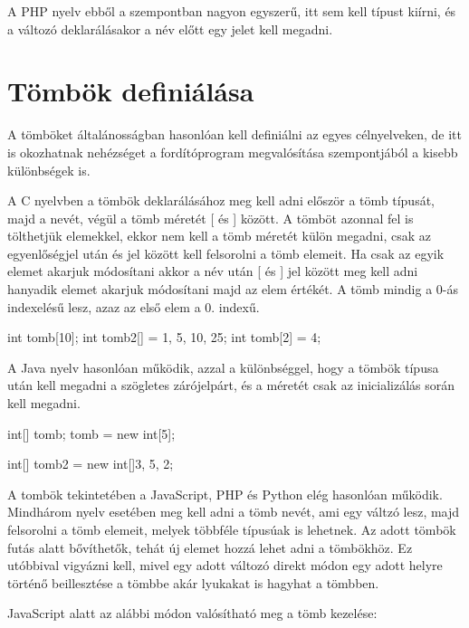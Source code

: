 A PHP nyelv ebből a szempontban nagyon egyszerű, itt sem kell típust kiírni, és a változó deklarálásakor a név előtt egy \textdollar jelet kell megadni.


\section{Tömbök definiálása}

A tömböket általánosságban hasonlóan kell definiálni az egyes célnyelveken, de itt is okozhatnak nehézséget a fordítóprogram megvalósítása szempontjából a kisebb különbségek is.

A C nyelvben a tömbök deklarálásához meg kell adni először a tömb típusát, majd a nevét, végül a tömb méretét [ és ] között. A tömböt azonnal fel is tölthetjük elemekkel, ekkor nem kell a tömb méretét külön megadni, csak az egyenlőségjel után { és } jel között kell felsorolni a tömb elemeit.
Ha csak az egyik elemet akarjuk módosítani akkor a név után [ és ] jel között meg kell adni hanyadik elemet akarjuk módosítani majd az elem értékét. A tömb mindig a 0-ás indexelésű lesz, azaz az első elem a 0. indexű.

\begin{cpp}
	int tomb[10];
	int tomb2[] = {1, 5, 10, 25};
	int tomb[2] = 4;
\end{cpp}

A Java nyelv hasonlóan működik, azzal a különbséggel, hogy a tömbök típusa után kell megadni a szögletes zárójelpárt, és a méretét csak az inicializálás során kell megadni.

\begin{cpp}
	int[] tomb;
	tomb = new int[5];
	
	int[] tomb2 = new int[]{3, 5, 2};
\end{cpp}

A tombök tekintetében a JavaScript, PHP és Python elég hasonlóan működik. Mindhárom nyelv esetében meg kell adni a tömb nevét, ami egy váltzó lesz, majd felsorolni a tömb elemeit, melyek többféle típusúak is lehetnek. Az adott tömbök futás alatt bővíthetők, tehát új elemet hozzá lehet adni a tömbökhöz. Ez utóbbival vigyázni kell, mivel egy adott változó direkt módon egy adott helyre történő beillesztése a tömbbe akár lyukakat is hagyhat a tömbben.

JavaScript alatt az alábbi módon valósítható meg a tömb kezelése:

